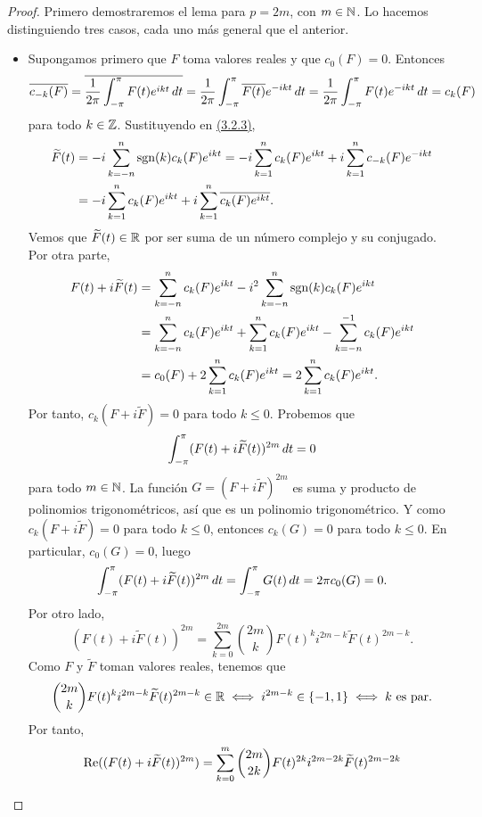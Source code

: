 \documentclass[a4paper, 12pt, oneside]{book}
\begin{document}
\begin{proof}
    Primero demostraremos el lema para $p = 2m$, con $m \in \mathbb N$. Lo hacemos distinguiendo tres casos, cada uno más general que el anterior.
    \begin{itemize}
        \item Supongamos primero que $F$ toma valores reales y que $c_0(F) = 0$. Entonces
        \[\overline{c_{-k}(F)} = \overline{\frac{1}{2\pi}\int_{-\pi}^{\pi} F(t)e^{ikt} \, dt} = \frac{1}{2\pi}\int_{-\pi}^{\pi} \overline{F(t)}e^{-ikt} \, dt =\frac{1}{2\pi}\int_{-\pi}^{\pi} {F(t)}e^{-ikt} \, dt = c_k(F)\]
        para todo $k\in\mathbb Z$. Sustituyendo en \hyperref[3.2.3]{\color{blue}(3.2.3)},
        \begin{align*}
            \widetilde{F}(t) &= -i\sum_{k=-n}^n \textup{sgn}(k)c_k(F)e^{ikt} = -i\sum_{k=1}^n c_k(F)e^{ikt}+i\sum_{k=1}^{n}c_{-k}(F)e^{-ikt} \\
            &=-i\sum_{k=1}^n c_k(F)e^{ikt}+i\sum_{k=1}^{n}\overline{c_k(F)e^{ikt}}.
        \end{align*}
        Vemos que $\widetilde{F}(t) \in \mathbb R$ por ser suma de un número complejo y su conjugado. Por otra parte,
        \begin{align*}
            F(t)+i\widetilde{F}(t) &= \sum_{k=-n}^n c_k(F)e^{ikt}-i^2\sum_{k=-n}^n \textup{sgn}(k)c_k(F)e^{ikt} \\ 
            &= \sum_{k=-n}^n c_k(F)e^{ikt}+\sum_{k=1}^n c_k(F)e^{ikt} - \sum_{k=-n}^{-1} c_k(F)e^{ikt} \\
            &=c_0(F)+2\sum_{k=1}^n c_k(F)e^{ikt} = 2\sum_{k=1}^n c_k(F)e^{ikt}.
        \end{align*}
        Por tanto, $c_k(F+i\widetilde{F}) = 0$ para todo $k \leq 0$. Probemos que
        \[\int_{-\pi}^{\pi} (F(t)+i\widetilde{F}(t))^{2m} \, dt = 0\]
        para todo $m \in \mathbb N$. La función $G = (F+i\widetilde{F})^{2m}$ es suma y producto de polinomios trigonométricos, así que es un polinomio trigonométrico. Y como $c_k(F+i\widetilde{F}) = 0$ para todo $k \leq 0$, entonces $c_k(G) = 0$ para todo $k \leq 0$. En particular, $c_0(G) = 0$, luego
        \[ \int_{-\pi}^{\pi} (F(t)+i\widetilde{F}(t))^{2m} \, dt = \int_{-\pi}^{\pi} G(t) \, dt = 2\pi c_0(G) = 0.\]
        Por otro lado,
        \[(F(t)+i\widetilde{F}(t))^{2m} = \sum_{k=0}^{2m}\binom{2m}{k}F(t)^ki^{2m-k}\widetilde{F}(t)^{2m-k}.\]Como $F$ y $\widetilde{F}$ toman valores reales, tenemos que
        \[\binom{2m}{k}F(t)^ki^{2m-k}\widetilde{F}(t)^{2m-k} \in \mathbb R \iff i^{2m-k} \in \{-1,1\} \iff k \textup{ es par}.\]
        Por tanto,
        \begin{align*}
            \real((F(t)+i\widetilde{F}(t))^{2m}) &= \sum_{k=0}^{m} \binom{2m}{2k}F(t)^{2k}i^{2m-2k}\widetilde{F}(t)^{2m-2k} \\

\end{align*}
\end{itemize}
\end{proof}
\end{document}
